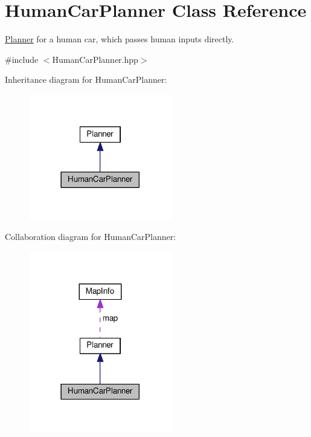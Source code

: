 \hypertarget{classHumanCarPlanner}{}\section{Human\+Car\+Planner Class Reference}
\label{classHumanCarPlanner}


\hyperlink{classPlanner}{Planner} for a human car, which passes human inputs directly.  




{\ttfamily \#include $<$Human\+Car\+Planner.\+hpp$>$}



Inheritance diagram for Human\+Car\+Planner\+:\nopagebreak
\begin{figure}[H]
\begin{center}
\leavevmode
\includegraphics[width=177pt]{classHumanCarPlanner__inherit__graph}
\end{center}
\end{figure}


Collaboration diagram for Human\+Car\+Planner\+:\nopagebreak
\begin{figure}[H]
\begin{center}
\leavevmode
\includegraphics[width=177pt]{classHumanCarPlanner__coll__graph}
\end{center}
\end{figure}
